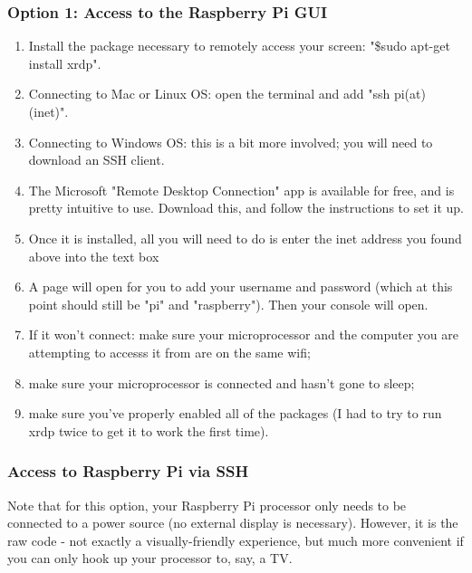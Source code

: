 \documentclass{article}\usepackage[]{graphicx}\usepackage[]{color}
\begin{document}
\subsubsection{Option 1: Access to the Raspberry Pi GUI}

\begin{enumerate}

\item Install the package necessary to remotely access your screen: "\$sudo apt-get install xrdp".
\item Connecting to Mac or Linux OS: open the terminal and add "ssh pi(at) (inet)".
\item Connecting to Windows OS: this is a bit more involved; you will need to download an SSH client.  
\item The Microsoft "Remote Desktop Connection" app is available for free, and is pretty intuitive to use.  Download this, and follow the instructions to set it up.  
\item Once it is installed, all you will need to do is enter the inet address you found above into the text box
\item A page will open for you to add your username and password (which at this point should still be "pi" and "raspberry").  Then your console will open.
\item If it won't connect: make sure your microprocessor and the computer you are attempting to accesss it from are on the same wifi;
\item make sure your microprocessor is connected and hasn't gone to sleep; 
\item make sure you've properly enabled all of the packages (I had to try to run xrdp twice to get it to work the first time).  

\end{enumerate}

\subsubsection{Access to Raspberry Pi via SSH}

Note that for this option, your Raspberry Pi processor only needs to be connected to a power source (no external display is necessary).  However, it is the raw code - not exactly a visually-friendly experience, but much more convenient if you can only hook up your processor to, say, a TV.
\end{document}
